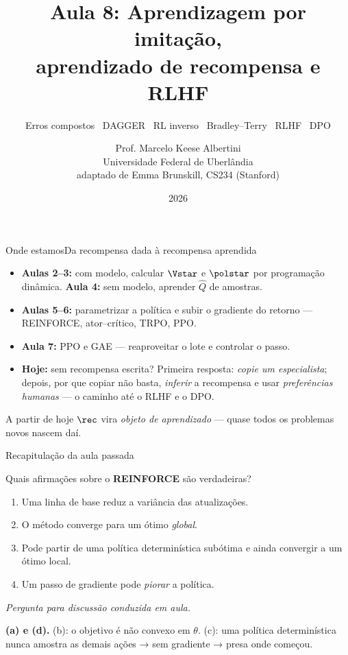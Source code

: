 \documentclass[aspectratio=169, 11pt]{beamer}
\title[Aula 8 — Imitação, recompensa e RLHF]{Aula 8: Aprendizagem por imitação,\\ aprendizado de recompensa e RLHF}
\subtitle[Aprendizagem por Reforço]{Erros compostos \textbullet\ DAGGER \textbullet\ RL inverso \textbullet\ Bradley--Terry \textbullet\ RLHF \textbullet\ DPO}
\author[Prof. Marcelo K. Albertini]{Prof. Marcelo Keese Albertini \\
  \footnotesize Universidade Federal de Uberlândia \\
  \footnotesize adaptado de Emma Brunskill, CS234 (Stanford)}
\institute{Universidade Federal de Uberlândia}
\date{2026}
\newcommand{\paradiscussao}{\smallskip
  {\footnotesize\color{rlCinza}\itshape Pergunta para discussão conduzida em aula.}}
\newcommand{\thv}{\theta}
\newcommand{\Qhat}{\hat{Q}}
\begin{document}
\begin{frame}\titlepage\end{frame}

\begin{frame}{Onde estamos}{Da recompensa dada à recompensa aprendida}

  \begin{itemize}\setlength{\itemsep}{0.45ex}
    \item \textbf{Aulas 2--3:} com modelo, calcular $\Vstar$ e $\polstar$ por
      programação dinâmica. \textbf{Aula 4:} sem modelo, aprender $\Qhat$ de
      amostras.
    \item \textbf{Aulas 5--6:} parametrizar a política e subir o gradiente do
      retorno --- REINFORCE, ator--crítico, TRPO, PPO.
    \item \textbf{Aula 7:} PPO e GAE --- reaproveitar o lote e controlar o passo.
    \item \textbf{Hoje:} sem recompensa escrita? Primeira resposta: \emph{copie um
      especialista}; depois, por que copiar não basta, \emph{inferir} a recompensa
      e usar \emph{preferências humanas} --- o caminho até o RLHF e o DPO.
  \end{itemize}

  \begin{ideiabox}
    A partir de hoje $\rec$ vira \emph{objeto de aprendizado} --- quase todos
    os problemas novos nascem daí.
  \end{ideiabox}
\end{frame}

\begin{frame}[shrink]{Recapitulação da aula passada}

  \begin{quizbox}{}
    Quais afirmações sobre o \textbf{REINFORCE} são verdadeiras?
    \begin{enumerate}\setlength{\itemsep}{0ex}
      \item[(a)] Uma linha de base reduz a variância das atualizações.
      \item[(b)] O método converge para um ótimo \emph{global}.
      \item[(c)] Pode partir de uma política determinística subótima e ainda
        convergir a um ótimo local.
      \item[(d)] Um passo de gradiente pode \emph{piorar} a política.
    \end{enumerate}
    \vspace{-0.3em}\paradiscussao
  \end{quizbox}

  \pause

  \begin{respbox}
    \textbf{(a) e (d).} \;(b): o objetivo é não convexo em $\thv$. \;(c): uma
    política determinística nunca amostra as demais ações → sem gradiente →
    presa onde começou.
  \end{respbox}
\end{frame}
\end{document}
